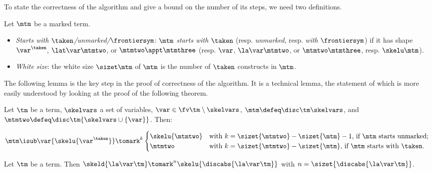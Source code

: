 To state the correctness of the algorithm and give a bound on the number of its steps, we need two definitions.

\begin{definition}
Let $\mtm$ be a marked term.
\begin{itemize}
\item \emph{Starts with $\taken$/unmarked/$\frontiersym$}:
$\mtm$ \emph{starts with $\taken$} (resp. \emph{unmarked}, resp. \emph{with} $\frontiersym$) if it has shape $\var^\taken$, $\lat\var\mtmtwo$, or $\mtmtwo\appt\mtmthree$ (resp. $\var$, $\la\var\mtmtwo$, or $\mtmtwo\mtmthree$, resp. $\skelu\mtm$).
\item \emph{White size}: the white size $\sizet\mtm$ of $\mtm$ is the number of $\taken$ constructs in $\mtm$.
\end{itemize}
\end{definition}

The following lemma is the key step in the proof of correctness of the algorithm. It is a technical lemma, the statement of which is more easily understood by looking at the proof of the following theorem.
\begin{toappendix}
\begin{lemma}[Crucial]
\label{l:disc-comp-step}
Let $\tm$ be a term, $\skelvars$ a set of variables, $\var \in\fv\tm\setminus \skelvars$, $\mtm \defeq \disc\tm\skelvars$, and $\mtmtwo \defeq \disc\tm{\skelvars \cup \{\var\}}$. Then:
\begin{center}$
\mtm\isub\var{\skelu{\var^\taken}} \tomark^{k} \begin{cases}
    \skelu{\mtmtwo} & \text{with $k = \sizet{\mtmtwo} - \sizet{\mtm}-1$, if $\mtm$ starts unmarked;} \\
    \mtmtwo & \text{with $k =\sizet{\mtmtwo} - \sizet{\mtm}$, if $\mtm$ starts with $\taken$.}
\end{cases}
$\end{center}
\end{lemma}
\end{toappendix}


\begin{theorem}
\label{thm:number-steps-algorithm}
Let $\tm$ be a term. Then
$\skeld{\la\var\tm} \tomark^n \skelu{\discabs{\la\var\tm}}$ with $n = \sizet{\discabs{\la\var\tm}}$.
\end{theorem}

